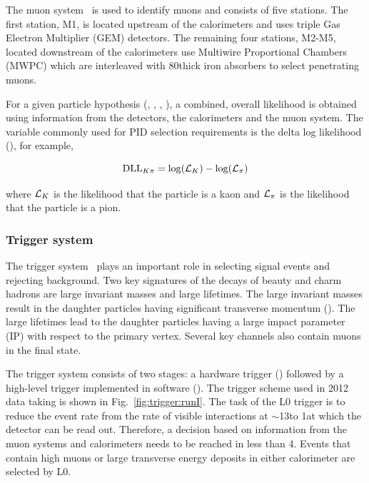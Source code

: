 The muon system~\cite{muon-tdr,muon-tdr2,muon-tdr3,muon-perf} is used to identify muons and consists of five stations. The first station, M1, is located upstream of the calorimeters and uses triple Gas Electron Multiplier (GEM) detectors. The remaining four stations, M2-M5, located downstream of the calorimeters use Multiwire Proportional Chambers (MWPC) which are interleaved with 80\cm thick iron absorbers to select penetrating muons.

For a given particle hypothesis (\kaon, \pion, \muon, \proton), a combined, overall likelihood is obtained using information from the \rich detectors, the calorimeters and the muon system. The variable commonly used for PID selection requirements is the delta log likelihood (\dll), for example,

\begin{equation}
\mathrm{DLL}_{{K}{\pi}} = \log(\mathcal{L}_{{K}}) - \log(\mathcal{L}_{{\pi}})
\end{equation}

\noindent where $\mathcal{L}_{{K}}$ is the likelihood that the particle is a kaon and $\mathcal{L}_{{\pi}}$ is the likelihood that the particle is a pion.
\subsubsection{Trigger system}
\label{detector:trigger}

The \lhcb trigger system~\cite{trigger-tdr,trigger-perf} plays an important role in selecting signal events and rejecting background. Two key signatures of the decays of beauty and charm hadrons are large invariant masses and large lifetimes. The large invariant masses result in the daughter particles having significant transverse momentum (\pt). The large lifetimes lead to the daughter particles having a large impact parameter (IP) with respect to the primary vertex. Several key channels also contain muons in the final state.

The trigger system consists of two stages: a hardware trigger (\lone) followed by a high-level trigger implemented in software (\hlt). The trigger scheme used in 2012 data taking is shown in Fig.~\ref{fig:trigger:runI}. The task of the L0 trigger is to reduce the event rate from the rate of visible interactions at $\sim$13\mhz to 1\mhz at which the \lhcb detector can be read out. Therefore, a decision based on information from the muon systems and calorimeters needs to be reached in less than 4\mus. Events that contain high \pt muons or large transverse energy deposits in either calorimeter are selected by L0.

